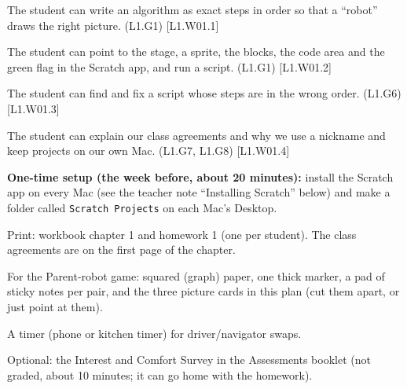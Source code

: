 
\begin{objectives}
  \item The student can write an algorithm as exact steps in order so that a \enquote{robot} draws the right picture. (L1.G1) [L1.W01.1]
  \item The student can point to the stage, a sprite, the blocks, the code area and the green flag in the Scratch app, and run a script. (L1.G1) [L1.W01.2]
  \item The student can find and fix a script whose steps are in the wrong order. (L1.G6) [L1.W01.3]
  \item The student can explain our class agreements and why we use a nickname and keep projects on our own Mac. (L1.G7, L1.G8) [L1.W01.4]
\end{objectives}

\begin{materials}
  \item \textbf{One-time setup (the week before, about 20 minutes):} install the Scratch app on every Mac (see the teacher note \enquote{Installing Scratch} below) and make a folder called \texttt{Scratch Projects} on each Mac's Desktop.
  \item Print: workbook chapter 1 and homework 1 (one per student). The class agreements are on the first page of the chapter.
  \item For the Parent-robot game: squared (graph) paper, one thick marker, a pad of sticky notes per pair, and the three picture cards in this plan (cut them apart, or just point at them).
  \item A timer (phone or kitchen timer) for driver/navigator swaps.
  \item Optional: the Interest and Comfort Survey in the Assessments booklet (not graded, about 10 minutes; it can go home with the homework).
\end{materials}

